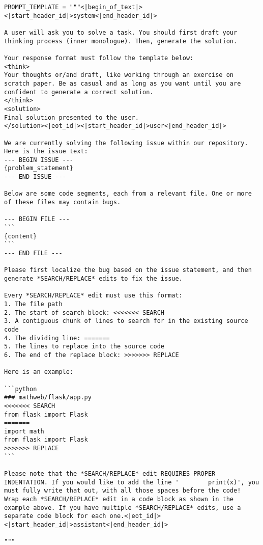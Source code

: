 {
\renewcommand*\ttdefault{cmtt}
\begin{lstlisting}[style=codeblock]
PROMPT_TEMPLATE = """<|begin_of_text|><|start_header_id|>system<|end_header_id|>

A user will ask you to solve a task. You should first draft your thinking process (inner monologue). Then, generate the solution.

Your response format must follow the template below:
<think>
Your thoughts or/and draft, like working through an exercise on scratch paper. Be as casual and as long as you want until you are confident to generate a correct solution.
</think>
<solution>
Final solution presented to the user.
</solution><|eot_id|><|start_header_id|>user<|end_header_id|>

We are currently solving the following issue within our repository. Here is the issue text:
--- BEGIN ISSUE ---
{problem_statement}
--- END ISSUE ---

Below are some code segments, each from a relevant file. One or more of these files may contain bugs.

--- BEGIN FILE ---
```
{content}
```
--- END FILE ---

Please first localize the bug based on the issue statement, and then generate *SEARCH/REPLACE* edits to fix the issue.

Every *SEARCH/REPLACE* edit must use this format:
1. The file path
2. The start of search block: <<<<<<< SEARCH
3. A contiguous chunk of lines to search for in the existing source code
4. The dividing line: =======
5. The lines to replace into the source code
6. The end of the replace block: >>>>>>> REPLACE

Here is an example:

```python
### mathweb/flask/app.py
<<<<<<< SEARCH
from flask import Flask
=======
import math
from flask import Flask
>>>>>>> REPLACE
```

Please note that the *SEARCH/REPLACE* edit REQUIRES PROPER INDENTATION. If you would like to add the line '        print(x)', you must fully write that out, with all those spaces before the code!
Wrap each *SEARCH/REPLACE* edit in a code block as shown in the example above. If you have multiple *SEARCH/REPLACE* edits, use a separate code block for each one.<|eot_id|><|start_header_id|>assistant<|end_header_id|>

"""
\end{lstlisting}
}

